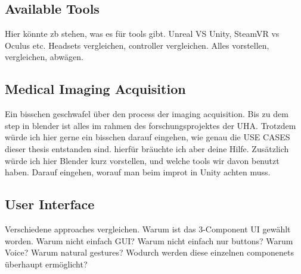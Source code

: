 \subsection{\label{sec::ApproachAvailableTools}Available Tools}

Hier könnte zb stehen, was es für tools gibt.
Unreal VS Unity, SteamVR vs Oculus etc.
Headsets vergleichen, controller vergleichen.
Alles vorstellen, vergleichen, abwägen.
%
%
\subsection{\label{sec::ApproachAcquisition}Medical Imaging Acquisition}
Ein bisschen geschwafel über den process der imaging acquisition.
Bis zu dem step in blender ist alles im rahmen des forschungsprojektes der UHA.
Trotzdem würde ich hier gerne ein bisschen darauf eingehen, wie genau die USE CASES
dieser thesis entstanden sind. hierfür bräuchte ich aber deine Hilfe.
Zusätzlich würde ich hier Blender kurz vorstellen, und welche tools wir davon benutzt haben.
Darauf eingehen, worauf man beim improt in Unity achten muss.
%
\subsection{\label{sec::ApproachUserInterface}User Interface}
Verschiedene approaches vergleichen.
Warum ist das 3-Component UI gewählt worden.
Warum nicht einfach GUI?
Warum nicht einfach nur buttons?
Warum Voice?
Warum natural gestures?
Wodurch werden diese einzelnen componenets überhaupt ermöglicht?
%
